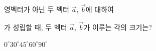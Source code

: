 영벡터가 아닌 두 벡터 $\vec{a}$, $\vec{b}$에 대하여\par\smallskip{}\par\smallskip\noindent 가 성립할 때, 두 벡터 $\vec{a}$, $\vec{b}$가 이루는 각의 크기는?
\begin{choices32}{$0^\circ$}{$30^\circ$}{$45^\circ$}{$60^\circ$}{$90^\circ$}\end{choices32}
